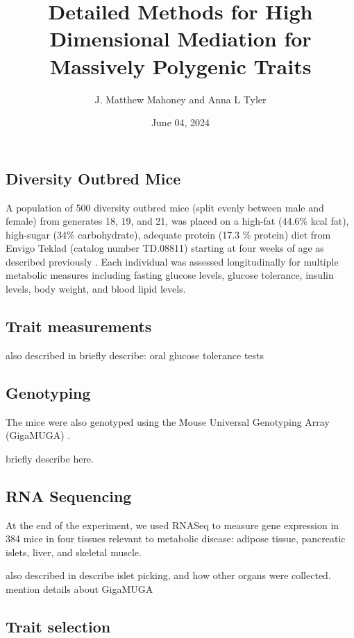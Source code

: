 \documentclass[
]{article}
\title{Detailed Methods for High Dimensional Mediation for Massively
Polygenic Traits}
\author{J. Matthew Mahoney and Anna L Tyler}
\date{June 04, 2024}
\begin{document}
\maketitle

\subsection{Diversity Outbred Mice}\label{diversity-outbred-mice}

A population of 500 diversity outbred mice (split evenly between male
and female) from generates 18, 19, and 21, was placed on a high-fat
(44.6\% kcal fat), high-sugar (34\% carbohydrate), adequate protein
(17.3 \% protein) diet from Envigo Teklad (catalog number TD.08811)
starting at four weeks of age as described previously
\cite{pmid29567659}. Each individual was assessed longitudinally for
multiple metabolic measures including fasting glucose levels, glucose
tolerance, insulin levels, body weight, and blood lipid levels.

\subsection{Trait measurements}\label{trait-measurements}

also described in \cite{pmid29567659} briefly describe: oral glucose
tolerance tests

\subsection{Genotyping}\label{genotyping}

The mice were also genotyped using the Mouse Universal Genotyping Array
(GigaMUGA) \cite{pmid29567659} .

briefly describe here.

\subsection{RNA Sequencing}\label{rna-sequencing}

At the end of the experiment, we used RNASeq to measure gene expression
in 384 mice in four tissues relevant to metabolic disease: adipose
tissue, pancreatic islets, liver, and skeletal muscle.

also described in \cite{pmid29567659} describe islet picking, and how
other organs were collected. mention details about GigaMUGA

\subsection{Trait selection}\label{trait-selection}
\end{document}
